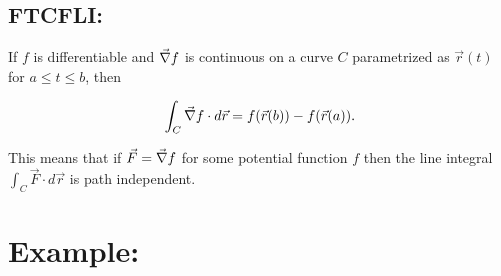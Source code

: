 \subsection{FTCFLI:}
If \(f\) is differentiable and \(\vec{\nabla} f\) is continuous on a curve \(C\) parametrized as \(\vec{r}(t)\) for \(a\leq t \leq b\), then

\[
\int_C \vec{\nabla} f \cdot d\vec{r} = f(\vec{r}(b)) - f(\vec{r}(a)).
\]

This means that if \(\vec{F}=\vec{\nabla} f\) for some potential function \(f\) then the line integral \(\int_C \vec{F}\cdot d\vec{r}\) is path independent.



\section*{Example:}


